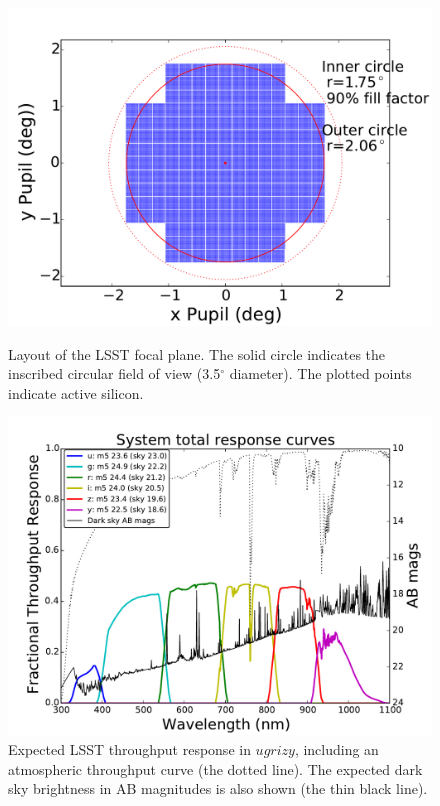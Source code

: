 \documentclass{iau}
\begin{document}
\begin{figure}[htb]
\begin{minipage}{.5\textwidth}
\begin{center}
\includegraphics[width=0.9\linewidth]{focalplane}
\captionsetup{width=0.9\linewidth}
\caption{Layout of the LSST focal plane. The solid circle indicates
  the inscribed circular field of view (3.5$^\circ$ diameter). The
  plotted points indicate active silicon.\label{focalplane}}
\end{center}
\end{minipage}
\begin{minipage}{.5\textwidth}
\begin{center}
\includegraphics[width=0.9\linewidth]{throughputs}
\captionsetup{width=0.9\linewidth}
\caption{Expected LSST throughput response in $ugrizy$, including
  an atmospheric throughput curve (the dotted line). The
  expected dark sky brightness in AB magnitudes is also shown (the
  thin black line).
\label{throughputs}}
\end{center}
\end{minipage}
\end{figure}
\end{document}
